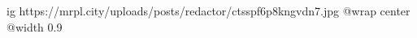  
 
 
 
 

\ifcmt
  ig https://mrpl.city/uploads/posts/redactor/ctsspf6p8kngvdn7.jpg
  @wrap center
  @width 0.9
\fi
